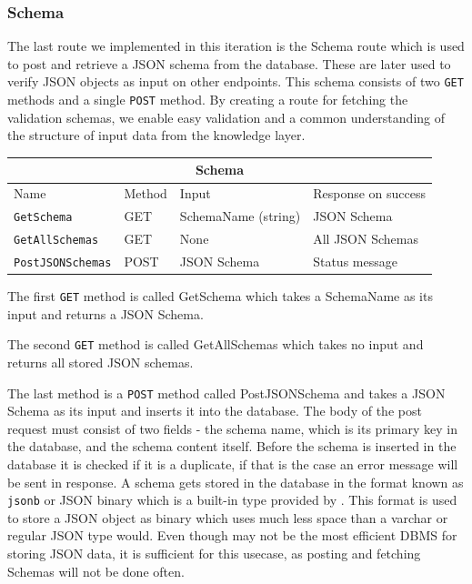 \subsubsection{Schema}
The last route we implemented in this iteration is the Schema route which is used to post and retrieve a JSON schema from the database. These are later used to verify JSON objects as input on other endpoints. 
This schema consists of two \texttt{GET} methods and a single \texttt{POST} method.
By creating a route for fetching the validation schemas, we enable easy validation and a common understanding of the structure of input data from the knowledge layer.
\begin{table}[h]
    \begin{tabular}{|llll|}
    \hline
    \multicolumn{4}{|c|}{\textbf{Schema}}                                                                                                     \\ \hline
    \multicolumn{1}{|l|}{Name}                     & \multicolumn{1}{l|}{Method} & \multicolumn{1}{l|}{Input}               & Response on success \\ \hline
    \multicolumn{1}{|l|}{\texttt{GetSchema}}       & \multicolumn{1}{l|}{GET}    & \multicolumn{1}{l|}{SchemaName (string)} & JSON Schema         \\ \hline
    \multicolumn{1}{|l|}{\texttt{GetAllSchemas}}   & \multicolumn{1}{l|}{GET}    & \multicolumn{1}{l|}{None}                & All JSON Schemas    \\ \hline
    \multicolumn{1}{|l|}{\texttt{PostJSONSchemas}} & \multicolumn{1}{l|}{POST}   & \multicolumn{1}{l|}{JSON Schema}         & Status message      \\ \hline
    \end{tabular}
    \end{table}

The first \texttt{GET} method is called GetSchema which takes a SchemaName as its input and returns a JSON Schema. 

The second \texttt{GET} method is called GetAllSchemas which takes no input and returns all stored JSON schemas. 

The last method is a \texttt{POST} method called PostJSONSchema and takes a JSON Schema as its input and inserts it into the database.
The body of the post request must consist of two fields - the schema name, which is its primary key in the database, and the schema content itself. Before the schema is inserted in the database it is checked if it is a duplicate, if that is the case an error message will be sent in response.
A schema gets stored in the database in the format known as \texttt{jsonb} or JSON binary which is a built-in type provided by \postgres{}.
This format is used to store a JSON object as binary which uses much less space than a varchar or regular JSON type would.
Even though \postgres{} may not be the most efficient DBMS for storing JSON data, it is sufficient for this usecase, as posting and fetching Schemas will not be done often. 